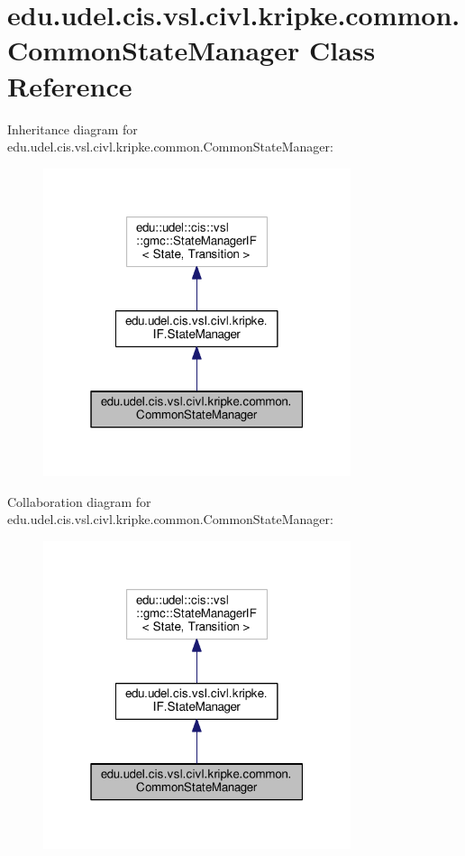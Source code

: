 \hypertarget{classedu_1_1udel_1_1cis_1_1vsl_1_1civl_1_1kripke_1_1common_1_1CommonStateManager}{}\section{edu.\+udel.\+cis.\+vsl.\+civl.\+kripke.\+common.\+Common\+State\+Manager Class Reference}
\label{classedu_1_1udel_1_1cis_1_1vsl_1_1civl_1_1kripke_1_1common_1_1CommonStateManager}


Inheritance diagram for edu.\+udel.\+cis.\+vsl.\+civl.\+kripke.\+common.\+Common\+State\+Manager\+:
\nopagebreak
\begin{figure}[H]
\begin{center}
\leavevmode
\includegraphics[width=256pt]{classedu_1_1udel_1_1cis_1_1vsl_1_1civl_1_1kripke_1_1common_1_1CommonStateManager__inherit__graph}
\end{center}
\end{figure}


Collaboration diagram for edu.\+udel.\+cis.\+vsl.\+civl.\+kripke.\+common.\+Common\+State\+Manager\+:
\nopagebreak
\begin{figure}[H]
\begin{center}
\leavevmode
\includegraphics[width=256pt]{classedu_1_1udel_1_1cis_1_1vsl_1_1civl_1_1kripke_1_1common_1_1CommonStateManager__coll__graph}
\end{center}
\end{figure}
